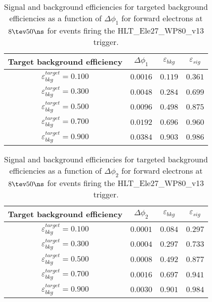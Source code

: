 \clearpage

\begin{table}[!bht]
  \begin{center}
    \begin{tabular}{cccc}
      \hline
      Target background efficiency & $\Delta\phi_1$ & $\varepsilon_{bkg}$ & $\varepsilon_{sig}$ \\ 
      \hline
      $\varepsilon_{bkg}^{target} = 0.100$ & $  0.0016$ & $0.119$ & $0.361$ \\
      $\varepsilon_{bkg}^{target} = 0.300$ & $  0.0048$ & $0.284$ & $0.699$ \\
      $\varepsilon_{bkg}^{target} = 0.500$ & $  0.0096$ & $0.498$ & $0.875$ \\
      $\varepsilon_{bkg}^{target} = 0.700$ & $  0.0192$ & $0.696$ & $0.960$ \\
      $\varepsilon_{bkg}^{target} = 0.900$ & $  0.0384$ & $0.903$ & $0.986$ \\
      \hline
    \end{tabular}
    \caption{Signal and background efficiencies for targeted background efficiencies as a function of $\Delta\phi_1$ for forward electrons at $8\tev 50\ns$ for events firing the HLT\_Ele27\_WP80\_v13 trigger.}
    \label{tab:eff_rej_phi1_beam_8_50_trigger_27_F}
  \end{center}
\end{table}

\clearpage

\begin{table}[!bht]
  \begin{center}
    \begin{tabular}{cccc}
      \hline
      Target background efficiency & $\Delta\phi_2$ & $\varepsilon_{bkg}$ & $\varepsilon_{sig}$ \\ 
      \hline
      $\varepsilon_{bkg}^{target} = 0.100$ & $  0.0001$ & $0.084$ & $0.297$ \\
      $\varepsilon_{bkg}^{target} = 0.300$ & $  0.0004$ & $0.297$ & $0.733$ \\
      $\varepsilon_{bkg}^{target} = 0.500$ & $  0.0008$ & $0.492$ & $0.877$ \\
      $\varepsilon_{bkg}^{target} = 0.700$ & $  0.0016$ & $0.697$ & $0.941$ \\
      $\varepsilon_{bkg}^{target} = 0.900$ & $  0.0030$ & $0.901$ & $0.984$ \\
      \hline
    \end{tabular}
    \caption{Signal and background efficiencies for targeted background efficiencies as a function of $\Delta\phi_2$ for forward electrons at $8\tev 50\ns$ for events firing the HLT\_Ele27\_WP80\_v13 trigger.}
    \label{tab:eff_rej_phi2_beam_8_50_trigger_27_F}
  \end{center}
\end{table}

